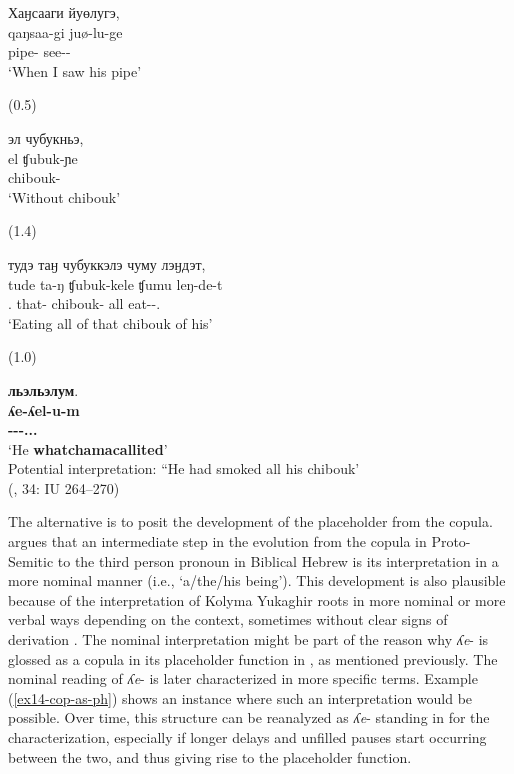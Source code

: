 \documentclass[output=paper,colorlinks,citecolor=brown
\ChapterDOI{10.5281/zenodo.15697581}
]{langscibook}
\begin{document}
\begin{exe}
\ex \label{ex13-ambiguous}
    \glll Хаӈсааги йуөлугэ, \\
    qaŋsaa-gi juø-lu-ge \\
    pipe-\Third\Poss{} see-\Fsg-\Loc \\
    \glt `When I saw his pipe'

\sn (0.5)

\sn
    \glll эл чубукньэ, \\
    el ʧubuk-ɲe \\
    \Neg{} chibouk-\Com{} \\
    \glt `Without chibouk'

\sn (1.4)

\sn 
    \glll тудэ таӈ чубуккэлэ чуму лэӈдэт,  \\
    tude ta-ŋ ʧubuk-kele ʧumu leŋ-de-t \\
    \Tsg.\Gen{} that-\Lnk{} chibouk-\Acc{} all eat-\Unk-\Cvb.\Ctx{} \\
    \glt `Eating all of that chibouk of his'

\sn (1.0)

\sn
    \glll \textbf{льэльэлум}. \\
    \textbf{ʎe-ʎel-u-m} \\
    \textbf{\Ph-\Ev-\Ep-\Ass.\Tr.\Ef.\Tsg{}} \\
    \glt `He \textbf{whatchamacallited}' \\
    Potential interpretation: ``He had smoked all his chibouk' \\
    \null \hfill (\citealt{Nikolaeva_Mayer2004}, 34: IU 264--270)
\end{exe}


The alternative is to posit the development of the placeholder from the copula. 
\citet{Katz1996} argues that an intermediate step in the evolution from the copula in Proto-Semitic to the third person pronoun in Biblical Hebrew is its interpretation in a more nominal manner (i.e., `a/the/his being'). 
This development is also plausible because of the interpretation of Kolyma Yukaghir roots in more nominal or more verbal ways depending on the context, sometimes without clear signs of derivation \citep{Ventayol-Boada-et-al2023}. 
The nominal interpretation might be part of the reason why \textit{ʎe}- is glossed as a copula in its placeholder function in \citet{Nikolaeva_Mayer2004}, as mentioned previously. 
The nominal reading of \textit{ʎe}- is later characterized in more specific terms.
Example (\ref{ex14-cop-as-ph}) shows an instance where such an interpretation would be possible. 
Over time, this structure can be reanalyzed as \textit{ʎe}- standing in for the characterization, especially if longer delays and unfilled pauses start occurring between the two, and thus giving rise to the placeholder function. 
\end{document}
